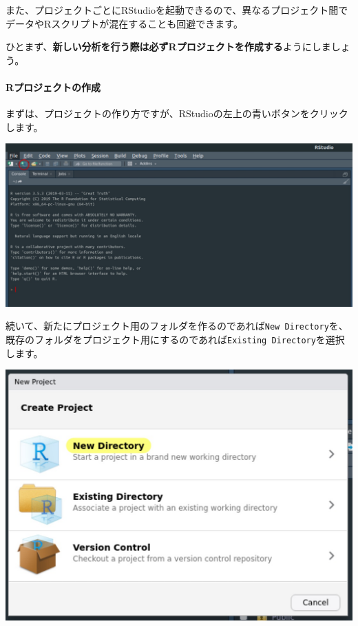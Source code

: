 \documentclass[]{bxjsreport}
\let\oldparagraph\paragraph
\renewcommand{\paragraph}[1]{\oldparagraph{#1}\mbox{}}
\begin{document}
また、プロジェクトごとにRStudioを起動できるので、異なるプロジェクト間でデータやRスクリプトが混在することも回避できます。

ひとまず、\textbf{新しい分析を行う際は必ずRプロジェクトを作成する}ようにしましょう。

\hypertarget{rux30d7ux30edux30b8ux30a7ux30afux30c8ux306eux4f5cux6210}{%
\paragraph{Rプロジェクトの作成}\label{rux30d7ux30edux30b8ux30a7ux30afux30c8ux306eux4f5cux6210}}

まずは、プロジェクトの作り方ですが、RStudioの左上の青いボタンをクリックします。

\includegraphics{figures/workflow2.jpg}

続いて、新たにプロジェクト用のフォルダを作るのであれば\texttt{New\ Directory}を、既存のフォルダをプロジェクト用にするのであれば\texttt{Existing\ Directory}を選択します。

\includegraphics{figures/workflow3.jpg}
\end{document}
